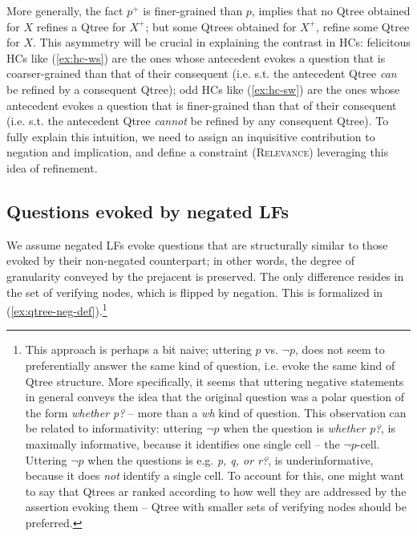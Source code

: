 More generally, the fact $p^+$ is finer-grained than $p$, implies that no Qtree obtained for $X$ refines a Qtree for $X^+$; but some Qtrees obtained for $X^+$, refine some Qtree for $X$. This asymmetry will be crucial in explaining the contrast in HCs: felicitous HCs like (\ref{ex:hc-ws}) are the ones whose antecedent evokes a question that is coarser-grained than that of their consequent (i.e. s.t. the antecedent Qtree \textit{can} be refined by a consequent Qtree); odd HCs like (\ref{ex:hc-sw}) are the ones whose antecedent evokes a question that is finer-grained than that of their consequent (i.e. s.t. the antecedent Qtree \textit{cannot} be refined by any consequent Qtree). To fully explain this intuition, we need to assign an inquisitive contribution to negation and implication, and define a constraint (\textsc{Relevance}) leveraging this idea of refinement.

\subsection{Questions evoked by negated LFs}\label{sec:neg}
We assume negated LFs evoke questions that are structurally similar to those evoked by their non-negated counterpart; in other words, the degree of granularity conveyed by the prejacent is preserved. The only difference resides in the set of verifying nodes, which is flipped by negation. This is formalized in (\ref{ex:qtree-neg-def}).\footnote{This approach is perhaps a bit naive; uttering $p$ vs. $\neg p$, does not seem to preferentially answer the same kind of question, i.e. evoke the same kind of Qtree structure. More specifically, it seems that uttering negative statements in general conveys the idea that the original question was a polar question of the form \textit{whether p?} -- more than a \textit{wh} kind of question. This observation can be related to informativity: uttering $\neg p$ when the question is \textit{whether p?}, is maximally informative, because it identifies one single cell -- the $\neg p$-cell. Uttering $\neg p$ when the questions is e.g. \textit{p, q, or r?}, is underinformative, because it does \textit{not} identify a single cell. To account for this, one might want to say that Qtrees ar ranked according to how well they are addressed by the assertion evoking them -- Qtree with smaller sets of verifying nodes should be preferred.}

